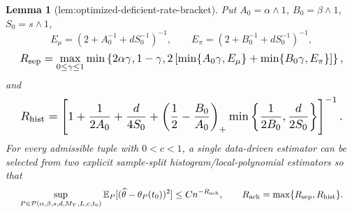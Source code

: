 \documentclass{article}
\newtheorem{lemma}{Lemma}
\begin{document}
\begin{lemma}[lem:optimized-deficient-rate-bracket]\label{lem:optimized-deficient-rate-bracket}
Put \(A_0=\alpha\wedge1\), \(B_0=\beta\wedge1\), \(S_0=s\wedge1\),
\[
E_\mu=(2+A_0^{-1}+dS_0^{-1})^{-1},\qquad E_\pi=(2+B_0^{-1}+dS_0^{-1})^{-1},
\]
\[
\makebox[\linewidth][c]{\resizebox{0.98\linewidth}{!}{\par\noindent \makebox[\linewidth][c]{\resizebox{0.98\linewidth}{!}{\(\displaystyle \displaystyle R_{\mathrm{sep}}=\max_{0\le\gamma\le1}\min\left\{2\alpha\gamma,1-\gamma,2\left[\min\{A_0\gamma,E_\mu\}+\min\{B_0\gamma,E_\pi\}\right]\right\},\)}}\par\noindent}}
\]
and
\[
\makebox[\linewidth][c]{\resizebox{0.98\linewidth}{!}{\par\noindent \makebox[\linewidth][c]{\resizebox{0.98\linewidth}{!}{\(\displaystyle \displaystyle R_{\mathrm{hist}}=\left[1+\frac1{2A_0}+\frac d{4S_0}+\left(\frac12-\frac{B_0}{A_0}\right)_+\min\left\{\frac1{2B_0},\frac d{2S_0}\right\}\right]^{-1}.\)}}\par\noindent}}
\]
For every admissible tuple with \(0<c<1\), a single data-driven estimator can be selected from two explicit sample-split histogram/local-polynomial estimators so that
\[
\makebox[\linewidth][c]{\resizebox{0.98\linewidth}{!}{\par\noindent \makebox[\linewidth][c]{\resizebox{0.98\linewidth}{!}{\(\displaystyle \displaystyle \sup_{P\in\mathcal P(\alpha,\beta,s,d,M_Y,L,c,t_0)}\mathbb E_P[(\widehat\theta-\theta_P(t_0))^2]\le Cn^{-R_{\mathrm{ach}}},\qquad R_{\mathrm{ach}}=\max\{R_{\mathrm{sep}},R_{\mathrm{hist}}\}.\)}}\par\noindent}}
\]
\end{lemma}
\end{document}

